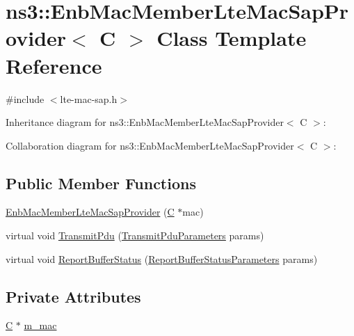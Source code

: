 \hypertarget{classns3_1_1EnbMacMemberLteMacSapProvider}{}\section{ns3\+:\+:Enb\+Mac\+Member\+Lte\+Mac\+Sap\+Provider$<$ C $>$ Class Template Reference}
\label{classns3_1_1EnbMacMemberLteMacSapProvider}


{\ttfamily \#include $<$lte-\/mac-\/sap.\+h$>$}



Inheritance diagram for ns3\+:\+:Enb\+Mac\+Member\+Lte\+Mac\+Sap\+Provider$<$ C $>$\+:


Collaboration diagram for ns3\+:\+:Enb\+Mac\+Member\+Lte\+Mac\+Sap\+Provider$<$ C $>$\+:
\subsection*{Public Member Functions}
\begin{DoxyCompactItemize}
\item 
\hyperlink{classns3_1_1EnbMacMemberLteMacSapProvider_ad14e76ab01deab7a15a8ce612ff50001}{Enb\+Mac\+Member\+Lte\+Mac\+Sap\+Provider} (\hyperlink{loss__COST231__small__cities__urban_8m_aaa53ca0b650dfd85c4f59fa156f7a2cc}{C} $\ast$mac)
\item 
virtual void \hyperlink{classns3_1_1EnbMacMemberLteMacSapProvider_a00d0878158765a999252dba996ea8164}{Transmit\+Pdu} (\hyperlink{structns3_1_1LteMacSapProvider_1_1TransmitPduParameters}{Transmit\+Pdu\+Parameters} params)
\item 
virtual void \hyperlink{classns3_1_1EnbMacMemberLteMacSapProvider_afdba01ddeff8ae89ad1a2240e2e8ab0b}{Report\+Buffer\+Status} (\hyperlink{structns3_1_1LteMacSapProvider_1_1ReportBufferStatusParameters}{Report\+Buffer\+Status\+Parameters} params)
\end{DoxyCompactItemize}
\subsection*{Private Attributes}
\begin{DoxyCompactItemize}
\item 
\hyperlink{loss__COST231__small__cities__urban_8m_aaa53ca0b650dfd85c4f59fa156f7a2cc}{C} $\ast$ \hyperlink{classns3_1_1EnbMacMemberLteMacSapProvider_a52de17b722613f341b5f3e3175ccd52a}{m\+\_\+mac}
\end{DoxyCompactItemize}


